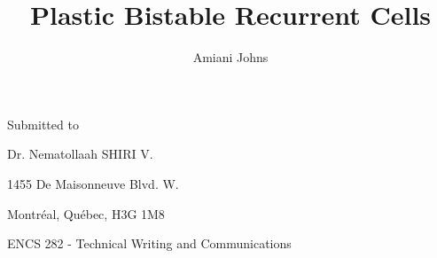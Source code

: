 \documentclass[12pt]{article}
\title{Plastic Bistable Recurrent Cells}
\author{Amiani Johns}
\begin{document}
\maketitle
\begin{center}
Submitted to

Dr. Nematollaah SHIRI V.

1455 De Maisonneuve Blvd. W.

Montréal, Québec, H3G 1M8

ENCS 282 - Technical Writing and Communications
\end{center}

\doublespacing

\clearpage



\clearpage



\clearpage


\end{document}
